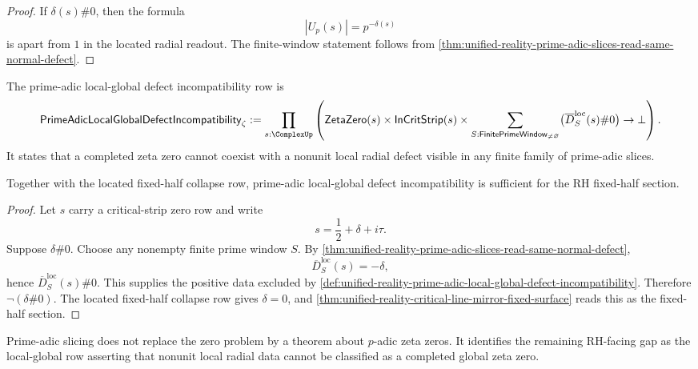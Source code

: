 \begin{proof}
If $\delta(s)\#0$, then the formula
$$
|U_p(s)|=p^{-\delta(s)}
$$
is apart from $1$ in the located radial readout.  The finite-window
statement follows from
\autoref{thm:unified-reality-prime-adic-slices-read-same-normal-defect}.
\end{proof}

\begin{definition}
\label{def:unified-reality-prime-adic-local-global-defect-incompatibility}
The prime-adic local-global defect incompatibility row is
$$
\mathsf{PrimeAdicLocalGlobalDefectIncompatibility}_{\zeta}
:=
\prod_{s:\ComplexUp}
\left(
\mathsf{ZetaZero}(s)
\times
\mathsf{InCritStrip}(s)
\times
\sum_{S:\mathsf{FinitePrimeWindow}_{\ne\varnothing}}
\bigl(\overline D_S^{\mathrm{loc}}(s)\#0\bigr)
\to
\bot
\right).
$$
It states that a completed zeta zero cannot coexist with a nonunit local
radial defect visible in any finite family of prime-adic slices.
\end{definition}

\begin{theorem}
\label{thm:unified-reality-prime-adic-local-global-incompatibility-conditionally-sufficient}
Together with the located fixed-half collapse row, prime-adic local-global
defect incompatibility is sufficient for the RH fixed-half section.
\end{theorem}

\begin{proof}
Let $s$ carry a critical-strip zero row and write
$$
s=\frac12+\delta+i\tau.
$$
Suppose $\delta\#0$.  Choose any nonempty finite prime window $S$.  By
\autoref{thm:unified-reality-prime-adic-slices-read-same-normal-defect},
$$
\overline D_S^{\mathrm{loc}}(s)=-\delta,
$$
hence $\overline D_S^{\mathrm{loc}}(s)\#0$.  This supplies the positive
data excluded by
\autoref{def:unified-reality-prime-adic-local-global-defect-incompatibility}.
Therefore $\neg(\delta\#0)$.  The located fixed-half collapse row gives
$\delta=0$, and
\autoref{thm:unified-reality-critical-line-mirror-fixed-surface} reads
this as the fixed-half section.
\end{proof}

\begin{corollary}
\label{cor:unified-reality-prime-adic-slicing-local-global-gap}
Prime-adic slicing does not replace the zero problem by a theorem about
$p$-adic zeta zeros.  It identifies the remaining RH-facing gap as the
local-global row asserting that nonunit local radial data cannot be
classified as a completed global zeta zero.
\end{corollary}

